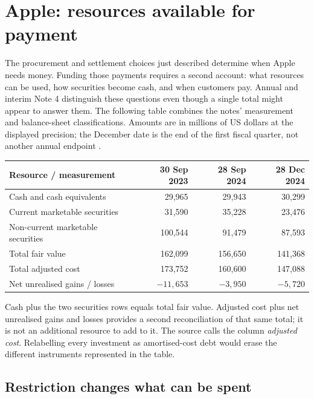 \section{Apple: resources available for payment}
\label{sec:apple-liquidity}

The procurement and settlement choices just described determine when Apple
needs money. Funding those payments requires a second account: what resources
can be used, how securities become cash, and when customers pay. Annual and
interim Note 4 distinguish these questions even though a single total might
appear to answer them. The following table combines the notes' measurement
and balance-sheet classifications. Amounts are in millions of US dollars at
the displayed precision; the December date is the end of the first fiscal
quarter, not another annual endpoint
\citep[Note 4, printed pp.~36--37]{apple2024}
\citep[Note 4, printed pp.~7--8]{apple2025q1}.

\begin{center}
\begin{tabular}{lrrr}
\toprule
Resource / measurement &30 Sep 2023&28 Sep 2024&28 Dec 2024\\\midrule
Cash and cash equivalents &29,965&29,943&30,299\\
Current marketable securities &31,590&35,228&23,476\\
Non-current marketable securities &100,544&91,479&87,593\\\midrule
Total fair value &162,099&156,650&141,368\\
Total adjusted cost &173,752&160,600&147,088\\
Net unrealised gains / losses &$-11,653$&$-3,950$&$-5,720$\\\bottomrule
\end{tabular}
\end{center}

Cash plus the two securities rows equals total fair value. Adjusted cost plus
net unrealised gains and losses provides a second reconciliation of that same
total; it is not an additional resource to add to it. The source calls the
column \emph{adjusted cost}. Relabelling every investment as amortised-cost
debt would erase the different instruments represented in the table.

\subsection{Restriction changes what can be spent}

